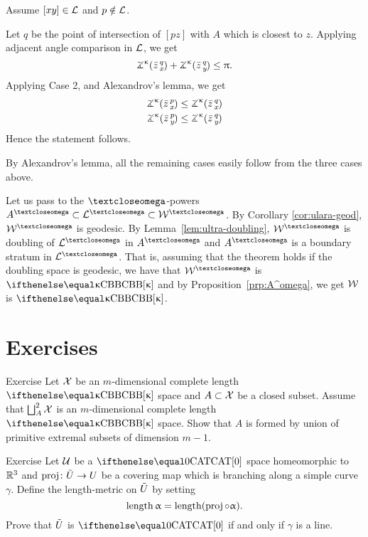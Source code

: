 Assume $[xy]\in\spc{L}$ and $p\notin\spc{L}$.

Let $q$ be the point of intersection of $[pz]$ with $A$ which is closest to $z$.
Applying adjacent angle comparison in $\spc{L}$,
we get 
\[\angk\kappa {\bar z} q x
+\angk\kappa {\bar z} q y\le \pi.\]
Applying Case 2, and Alexandrov's lemma,
we get
\begin{align*}
\angk\kappa {\bar z} p x&\le \angk\kappa {\bar z} q x
\\
\angk\kappa {\bar z} p y&\le \angk\kappa {\bar z} q y
\end{align*}
Hence the statement follows.

 By Alexandrov's lemma,
all the remaining cases easily follow from the three cases above.

Let us pass to the $\o$-powers $A^\o\subset \spc{L}^\o\subset\spc{W}^\o$.
By Corollary \ref{cor:ulara-geod}, $\spc{W}^\o$ is geodesic.
By Lemma~\ref{lem:ultra-doubling},
 $\spc{W}^\o$ is doubling of $\spc{L}^\o$ in $A^\o$ and $A^\o$ is a boundary stratum in $\spc{L}^\o$.
That is, assuming that the theorem holds if the doubling space is geodesic, we have that $\spc{W}^\o$ is $\Alex\kappa$ and by Proposition~\ref{prp:A^omega}, we get $\spc{W}$ is $\Alex\kappa$.
\qeds









\section{Exercises}



\begin{thm}{Exercise}
Let $\spc{X}$ be an $m$-dimensional complete length $\Alex\kappa$ space and $A\subset \spc{X}$ be a closed subset.
Assume that  $\Doubling{A}{\spc{X}}$ is an $m$-dimensional complete length $\Alex\kappa$ space. 
Show that $A$ is formed by union of primitive extremal subsets of dimension $m-1$.
\end{thm}

\begin{thm}{Exercise}
Let $\spc{U}$ be a $\CAT0$ space homeomorphic to $\RR^3$ and 
$\proj\:\~U\to U$ be a covering map which is branching along a simple curve $\gamma$.
Define the length-metric on $\~U$ by setting 
\[\length\alpha=\length(\proj\circ\alpha).\]
Prove that $\~U$ is $\CAT0$ if and only if $\gamma$ is a line.
\end{thm}


